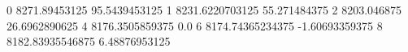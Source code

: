 0 8271.89453125 95.5439453125
1 8231.6220703125 55.271484375
2 8203.046875 26.6962890625
4 8176.3505859375 0.0
6 8174.74365234375 -1.60693359375
8 8182.83935546875 6.48876953125

